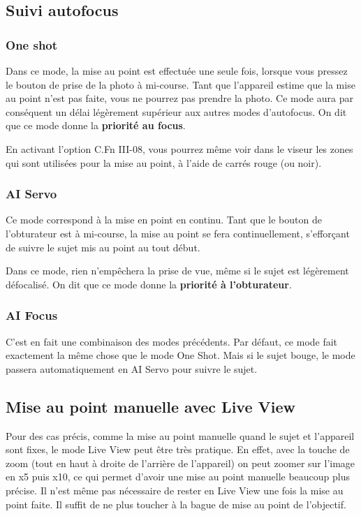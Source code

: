 \documentclass[a4paper,twoside]{article}
\begin{document}
\subsection{Suivi autofocus}
\subsubsection{One shot}
Dans ce mode, la mise au point est effectuée une seule fois, lorsque vous pressez le bouton de prise de la photo à mi-course. Tant que l'appareil estime que la mise au point n'est pas faite, vous ne pourrez pas prendre la photo. Ce mode aura par conséquent un délai légèrement supérieur aux autres modes d'autofocus. On dit que ce mode donne la \textbf{priorité au focus}.

\begin{remarque}
En activant l'option C.Fn III-08, vous pourrez même voir dans le viseur les zones qui sont utilisées pour la mise au point, à l'aide de carrés rouge (ou noir). 
\end{remarque}

\subsubsection{AI Servo}
Ce mode correspond à la mise en point en continu. Tant que le bouton de l'obturateur est à mi-course, la mise au point se fera continuellement, s'efforçant de suivre le sujet mis au point au tout début.

Dans ce mode, rien n'empêchera la prise de vue, même si le sujet est légèrement défocalisé. On dit que ce mode donne la \textbf{priorité à l'obturateur}.

\subsubsection{AI Focus}
C'est en fait une combinaison des modes précédents. Par défaut, ce mode fait exactement la même chose que le mode One Shot. Mais si le sujet bouge, le mode passera automatiquement en AI Servo pour suivre le sujet. 

\subsection{Mise au point manuelle avec Live View}
Pour des cas précis, comme la mise au point manuelle quand le sujet et l'appareil sont fixes, le mode Live View peut être très pratique. En effet, avec la touche de zoom (tout en haut à droite de l'arrière de l'appareil) on peut zoomer sur l'image en x5 puis x10, ce qui permet d'avoir une mise au point manuelle beaucoup plus précise. Il n'est même pas nécessaire de rester en Live View une fois la mise au point faite. Il suffit de ne plus toucher à la bague de mise au point de l'objectif.
\end{document}
